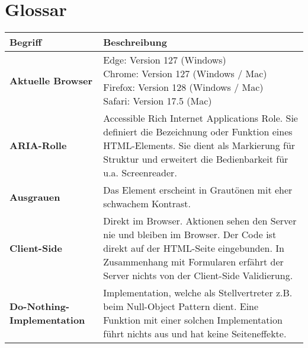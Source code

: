 \chapter{Glossar}
\label{chap:glossary}

\newcommand{\glossarywithTitle}{0.22\textwidth}
\newcommand{\glossarywith}{0.76\textwidth}

\vspace*{-1cm}
\begin{table}[!ht]
    \centering
    \footnotesize
    \begin{adjustbox}{max width=\textwidth}
        \begin{threeparttable}
            \begin{tabular}{ p{\glossarywithTitle} | p{\glossarywith} }
                \bf{Begriff} & \bf{Beschreibung} \\
                \hline \hline
                \bf{Aktuelle Browser} & \tbbr{
                    Edge: Version 127 (Windows) \\
                    Chrome: Version 127 (Windows / Mac) \\
                    Firefox: Version 128 (Windows / Mac) \\
                    Safari: Version 17.5 (Mac)
                } \\
                \hline
                \bf{ARIA-Rolle} & Accessible Rich Internet Applications Role.
                    Sie definiert die Bezeichnung oder Funktion eines HTML-Elements.
                    Sie dient als Markierung für Struktur und erweitert die Bedienbarkeit für u.a. Screenreader. \\
                \hline
                \bf{Ausgrauen} & Das Element erscheint in Grautönen mit eher schwachem Kontrast. \\
                \hline
                \bf{Client-Side} & Direkt im Browser. 
                    Aktionen sehen den Server nie und bleiben im Browser. 
                    Der Code ist direkt auf der HTML-Seite eingebunden. 
                    In Zusammenhang mit Formularen erfährt der Server nichts von der Client-Side Validierung. \\
                \hline
                \raggedright \bf{Do-Nothing-Implementation} & 
                    Implementation, welche als Stellvertreter z.B. beim Null-Object Pattern dient. 
                    Eine Funktion mit einer solchen Implementation führt nichts aus und hat keine Seiteneffekte. \\

\end{tabular}
\end{threeparttable}
\end{adjustbox}
\end{table}
